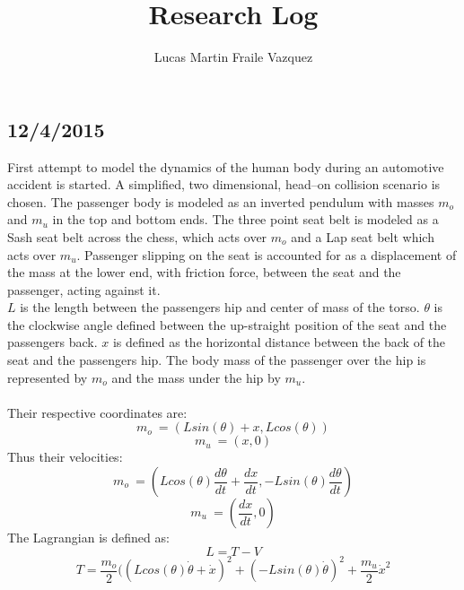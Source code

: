 \documentclass[10pt,a4paper]{article}
\begin{document}
\title{Research Log}
\author{Lucas Martin Fraile Vazquez}
\maketitle
\subsection{12/4/2015}

First attempt to model the dynamics of the human body during an automotive accident is started. A simplified, two dimensional, head--on collision scenario is chosen.  The passenger body is modeled as an inverted pendulum with masses $m_{o}$ and $m_{u}$ in the top and bottom ends. The three point seat belt is modeled as a Sash seat belt across the chess, which acts over $m_{o}$ and a Lap seat belt which acts over $m_{u}$. Passenger slipping on the seat is accounted for as a displacement of the mass at the lower end, with friction force, between the seat and the passenger, acting against it.
\\ $ L$ is the length between the passengers hip and center of mass of the torso. $ \theta $ is the clockwise angle defined between the up-straight position of the seat and the passengers back. $ x $ is defined as the horizontal distance between the back of the seat and the passengers hip. The body mass of the passenger over the hip is represented by $m_{o}$ and the mass under the hip by $m_{u}$.
\\\\Their respective coordinates are:
\begin{equation}
m_{o}\ =(Lsin(\theta)+x,Lcos(\theta))
\end{equation}
\begin{equation}
m_{u}\ =(x,0)
\end{equation}
Thus their velocities:
\begin{equation}
m_{o}\ =(Lcos(\theta)\dfrac{d \theta}{d t} + \dfrac{d x}{d t} ,-Lsin(\theta)\dfrac{d \theta}{d t})
\end{equation}
\begin{equation}
m_{u}\ =(\dfrac{d x}{d t},0)
\end{equation}
The Lagrangian is defined as:
\begin{equation}
L=T-V
\end{equation}
\begin{equation}
T=\dfrac{m_{o}}{2}((Lcos(\theta)\dot \theta + \dot x)^{2}+(-Lsin(\theta)\dot \theta)^{2}+\dfrac{m_{u}}{2}\dot x^{2}
\end{equation}
\end{document}
